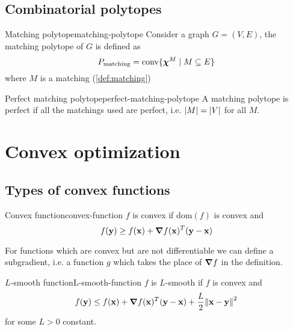 \documentclass[12pt]{extarticle}
\renewcommand{\vec}[1]{\bvec{#1}}
\numberwithin{equation}{subsection}
\begin{document}
\subsection{Combinatorial polytopes}

\begin{definition}{Matching polytope}{matching-polytope}
	Consider a graph $G = (V, E)$, the matching polytope of $G$ is defined as
	\begin{equation}
		P_\text{matching} = \conv\{ \vec \chi^M \mid M \subseteq E\}
	\end{equation}
	where $M$ is a matching (\cref{def:matching})
\end{definition}

\begin{definition}{Perfect matching polytope}{perfect-matching-polytope}
	A matching polytope is perfect if all the matchings used are perfect, i.e. $\abs{M} = \abs{V}$ for
	all $M$.
\end{definition}

\section{Convex optimization}

\subsection{Types of convex functions}

\begin{definition}{Convex function}{convex-function}
	$f$ is convex if $\mathrm{dom}(f)$ is convex and
	\begin{equation}
		f(\vec y) \geq f(\vec x) + \grad f(\vec x)^T (\vec y - \vec x)
	\end{equation}
\end{definition}

For functions which are convex but are not differentiable we can define a subgradient, i.e. a
function $g$ which takes the place of $\grad f$ in the definition.

\begin{definition}{$L$-smooth function}{L-smooth-function}
	$f$ is $L$-smooth if $f$ is convex and
	\begin{equation}
		f(\vec y) \leq f(\vec x) + \grad f(\vec x)^T (\vec y - \vec x)
		+ \frac{L}{2} \norm{\vec x - \vec y}^2
	\end{equation}
	for some $L > 0$ constant.
\end{definition}
\end{document}
